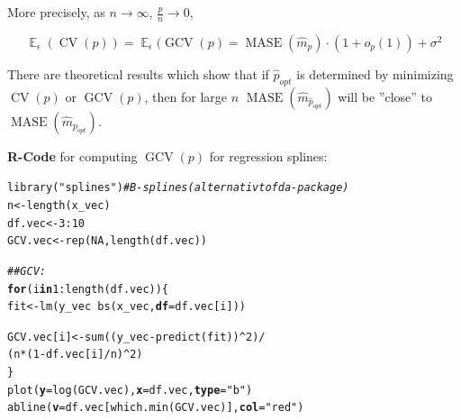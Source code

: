 \documentclass[14pt]{extreport}\usepackage[]{graphicx}\usepackage[]{xcolor}
\makeatletter
\newcommand{\hlnum}[1]{\textcolor[rgb]{0.69,0.494,0}{#1}}%
\newcommand{\hlstr}[1]{\textcolor[rgb]{0.749,0.012,0.012}{#1}}%
\newcommand{\hlcom}[1]{\textcolor[rgb]{0.514,0.506,0.514}{\textit{#1}}}%
\newcommand{\hlopt}[1]{\textcolor[rgb]{0,0,0}{#1}}%
\newcommand{\hlstd}[1]{\textcolor[rgb]{0,0,0}{#1}}%
\newcommand{\hlkwa}[1]{\textcolor[rgb]{0,0,0}{\textbf{#1}}}%
\newcommand{\hlkwb}[1]{\textcolor[rgb]{0,0.341,0.682}{#1}}%
\newcommand{\hlkwc}[1]{\textcolor[rgb]{0,0,0}{\textbf{#1}}}%
\newcommand{\hlkwd}[1]{\textcolor[rgb]{0.004,0.004,0.506}{#1}}%
\newenvironment{kframe}{%
 \def\at@end@of@kframe{}%
 \ifinner\ifhmode%
  \def\at@end@of@kframe{\end{minipage}}%
  \begin{minipage}{\columnwidth}%
 \fi\fi%
 \def\FrameCommand##1{\hskip\@totalleftmargin \hskip-\fboxsep
 \colorbox{shadecolor}{##1}\hskip-\fboxsep
     \hskip-\linewidth \hskip-\@totalleftmargin \hskip\columnwidth}%
 \MakeFramed {\advance\hsize-\width
   \@totalleftmargin\z@ \linewidth\hsize
   \@setminipage}}%
 {\par\unskip\endMakeFramed%
 \at@end@of@kframe}
\newenvironment{knitrout}{}{} %
\DeclareMathOperator{\E}{\mathbb{E}}
\makeatother
\begin{document}
\bigbreak

More precisely, as $n\rightarrow\infty$, $\frac{p}{n}\rightarrow 0$,

$$\E_\epsilon(\operatorname{CV}(p))=\E_\epsilon(\operatorname{GCV}(p) =\operatorname{MASE}(\hat m_p)\cdot (1+o_p(1))+\sigma^2$$


\bigbreak

There are theoretical results which show that if $\hat p_{opt}$ is determined by minimizing
$\operatorname{CV}(p)$ or $\operatorname{GCV}(p)$, then for large $n$ $\operatorname{MASE}(\hat m_{\hat p_{opt}})$ will be ''close'' to
$\operatorname{MASE}(\hat m_{ p_{opt}})$.

\bigbreak

\textbf{R-Code} for computing $\operatorname{GCV}(p)$ for regression splines:

\begin{knitrout}
\color{fgcolor}\begin{kframe}
\begin{alltt}
\hlkwd{library}\hlstd{(}\hlstr{"splines"}\hlstd{)}  \hlcom{# B-splines (alternativ to fda-package) }
\hlstd{n}       \hlkwb{<-} \hlkwd{length}\hlstd{(x_vec)}
\hlstd{df.vec}  \hlkwb{<-} \hlnum{3}\hlopt{:}\hlnum{10}
\hlstd{GCV.vec} \hlkwb{<-} \hlkwd{rep}\hlstd{(}\hlnum{NA}\hlstd{,} \hlkwd{length}\hlstd{(df.vec))}

\hlcom{## GCV:}
\hlkwa{for}\hlstd{(i} \hlkwa{in} \hlnum{1}\hlopt{:}\hlkwd{length}\hlstd{(df.vec))\{}
  \hlstd{fit} \hlkwb{<-} \hlkwd{lm}\hlstd{(y_vec} \hlopt{~} \hlkwd{bs}\hlstd{(x_vec,} \hlkwc{df} \hlstd{= df.vec[i]))}

  \hlstd{GCV.vec[i]} \hlkwb{<-} \hlkwd{sum}\hlstd{((y_vec} \hlopt{-} \hlkwd{predict}\hlstd{(fit))}\hlopt{^}\hlnum{2}\hlstd{)}\hlopt{/}
                    \hlstd{(n}\hlopt{*}\hlstd{(}\hlnum{1} \hlopt{-} \hlstd{df.vec[i]}\hlopt{/}\hlstd{n)}\hlopt{^}\hlnum{2}\hlstd{)}
\hlstd{\}}
\hlkwd{plot}\hlstd{(}\hlkwc{y}\hlstd{=}\hlkwd{log}\hlstd{(GCV.vec),} \hlkwc{x}\hlstd{=df.vec,} \hlkwc{type}\hlstd{=}\hlstr{"b"}\hlstd{)}
\hlkwd{abline}\hlstd{(}\hlkwc{v}\hlstd{=df.vec[}\hlkwd{which.min}\hlstd{(GCV.vec)],} \hlkwc{col}\hlstd{=}\hlstr{"red"}\hlstd{)}
\end{alltt}
\end{kframe}


\end{knitrout}
\end{document}
